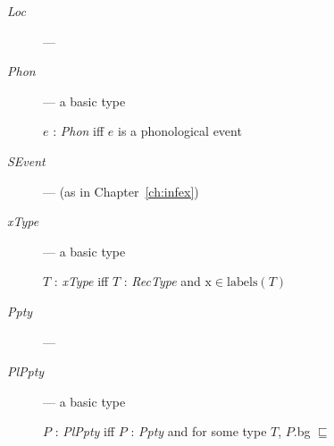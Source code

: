 \begin{description}

  \item[\textnormal{\textit{Loc}}] --- 

  
\item[\textnormal{\textit{Phon}}] --- a basic type

  $e$ : \textit{Phon} iff $e$ is a phonological event
  
\item[\textnormal{\textit{SEvent}}] ---  (as in
      Chapter~\ref{ch:infex})
      

      
      
    \item[\textnormal{\textit{xType}}] --- a basic type

      $T$ : \textit{xType} iff $T$ : \textit{RecType} and $\text{x}\in\mathrm{labels}(T)$

      \item[\textnormal{\textit{Ppty}}] ---
        
      \item[\textnormal{\textit{PlPpty}}] --- a basic type

        $P$ : \textit{PlPpty} iff $P$ : \textit{Ppty} and for some type $T$,
$P$.bg $\sqsubseteq$  
        

\end{description}
